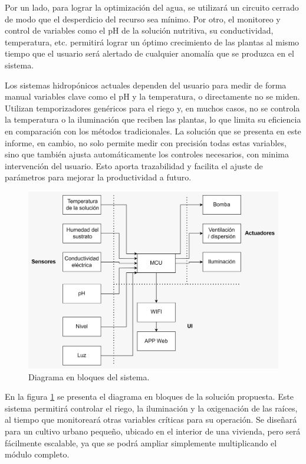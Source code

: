 \documentclass[
11pt, %
]{charter}
\begin{document}
Por un lado, para lograr  la optimización del agua, se utilizará un circuito cerrado de modo que el desperdicio del recurso sea mínimo. Por otro, el monitoreo y control de variables como el pH de la solución nutritiva, su conductividad, temperatura, etc. permitirá lograr un óptimo crecimiento de las plantas al mismo tiempo que el usuario será alertado de cualquier anomalía que se produzca en el sistema.

Los sistemas hidropónicos actuales dependen del usuario para medir de forma manual variables clave como el pH y la temperatura, o directamente no se miden. Utilizan temporizadores genéricos para el riego y, en muchos casos, no se controla la temperatura o la iluminación que reciben las plantas, lo que limita su eficiencia en comparación con los métodos tradicionales. La solución que se presenta en este informe, en cambio, no solo permite medir con precisión todas estas variables, sino que también ajusta automáticamente los controles necesarios, con minima intervención del usuario. Esto aporta trazabilidad y facilita el ajuste de parámetros para mejorar la productividad a futuro.

\begin{figure}[htpb]
\centering 
\includegraphics[width=.85\textwidth]{./Figuras/d_bloques.png}
\caption{Diagrama en bloques del sistema.}
\label{fig:d_bloques}
\end{figure}

En la figura \ref{fig:d_bloques} se presenta el diagrama en bloques de la solución propuesta. Este sistema permitirá controlar el riego, la iluminación y la oxigenación de las raíces, al tiempo que monitoreará otras variables críticas para su operación. Se diseñará para un cultivo urbano pequeño, ubicado en el interior de una vivienda, pero será fácilmente escalable, ya que se podrá ampliar simplemente multiplicando el módulo completo. 
\end{document}
